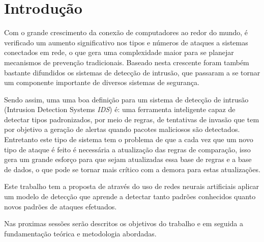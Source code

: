 \chapter*[Introdução]{Introdução}

Com o grande crescimento da conexão de computadores ao redor do mundo, é verificado um aumento significativo nos tipos e números de ataques a sistemas conectados em rede, o que gera uma complexidade maior para se planejar mecanismos de prevenção tradicionais. Baseado nesta crescente foram também bastante difundidos os sistemas de detecção de intrusão, que passaram a se tornar um componente importante de diversos sistemas de segurança.

Sendo assim, uma uma boa definição para um sistema de detecção de intrusão (Intrusion Detection Systems \textit{IDS}) é: uma ferramenta inteligente capaz de detectar tipos padronizados, por meio de regras, de tentativas de invasão que tem por objetivo a geração de alertas quando pacotes maliciosos são detectados. Entretanto este tipo de sistema tem o problema de que a cada vez que um novo tipo de ataque é feito é necessária a atualização das regras de comparação, isso gera um grande esforço para que sejam atualizadas essa base de regras e a base de dados, o que pode se tornar mais crítico com a demora para estas atualizações.

Este trabalho tem a proposta de através do uso de redes neurais artificiais aplicar um modelo de detecção que aprende a detectar tanto padrões conhecidos quanto novos padrões de  ataques efetuados.

Nas proximas sessões serão descritos os objetivos do trabalho e em seguida a fundamentação teórica e metodologia abordadas.